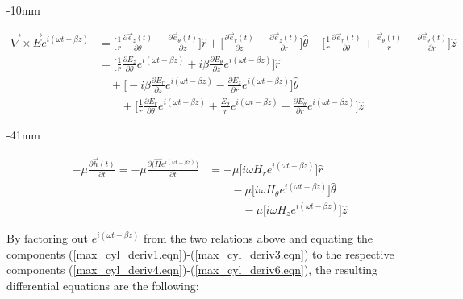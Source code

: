 \documentclass[12pt]{article}
\theoremstyle{definition}
\numberwithin{equation}{section}
\begin{document}
\begin{adjustwidth*}{}{-10mm}

\begin{align}
\vec{\nabla}\times\vec{E}e^{i(\omega t-\beta z)} &= \bigg[\frac{1}{r}\frac{\partial\vec{e}_{z}(t)}{\partial\theta}-\frac{\partial\vec{e}_{\theta}(t)}{\partial z}\bigg]\hat{r}+\bigg[\frac{\partial\vec{e}_{r}(t)}{\partial z}-\frac{\partial\vec{e}_{z}(t)}{\partial r}\bigg]\hat{\theta}+\bigg[\frac{1}{r}\frac{\partial\vec{e}_{r}(t)}{\partial\theta}+\frac{\vec{e}_{\theta}(t)}{r}-\frac{\partial\vec{e}_{\theta}(t)}{\partial r}\bigg]\hat{z}\nonumber
\\&= \bigg[\frac{1}{r}\frac{\partial E_z}{\partial\theta}e^{i(\omega t-\beta z)}+i\beta\frac{\partial E_{\theta}}{\partial z}e^{i(\omega t-\beta z)}\bigg]\hat{r}\label{max_cyl_deriv1.eqn}
\\&\quad+ \bigg[-i\beta\frac{\partial E_r}{\partial z}e^{i(\omega t-\beta z)}-\frac{\partial E_z}{\partial r}e^{i(\omega t-\beta z)}\bigg]\hat{\theta}\label{max_cyl_deriv2.ewn}
\\&\qquad+ \bigg[\frac{1}{r}\frac{\partial E_r}{\partial\theta}e^{i(\omega t-\beta z)}+\frac{E_{\theta}}{r}e^{i(\omega t-\beta z)}-\frac{\partial E_{\theta}}{\partial r}e^{i(\omega t-\beta z)}\bigg]\hat{z}\label{max_cyl_deriv3.eqn}
\end{align}
\end{adjustwidth*}

\begin{adjustwidth*}{}{-41mm}

\begin{align}
-\mu\frac{\partial\vec{h}(t)}{\partial t}=-\mu\frac{\partial\big(\vec{H}e^{i(\omega t-\beta z)}\big)}{\partial t} &= -\mu\bigg[ i\omega H_{r}e^{i(\omega t-\beta z)}\bigg]\hat{r} \label{max_cyl_deriv4.eqn}
\\&\qquad- \mu\bigg[ i\omega H_{\theta}e^{i(\omega t-\beta z)}\bigg]\hat{\theta}\label{max_cyl_deriv5.eqn}
\\&\qquad\quad- \mu\bigg[ i\omega H_{z}e^{i(\omega t-\beta z)}\bigg]\hat{z}\label{max_cyl_deriv6.eqn}
\end{align}
\end{adjustwidth*}

By factoring out $e^{i(\omega t-\beta z)}$ from the two relations above and equating the components (\ref{max_cyl_deriv1.eqn})-(\ref{max_cyl_deriv3.eqn}) to the respective components (\ref{max_cyl_deriv4.eqn})-(\ref{max_cyl_deriv6.eqn}), the resulting differential equations are the following:
\end{document}

